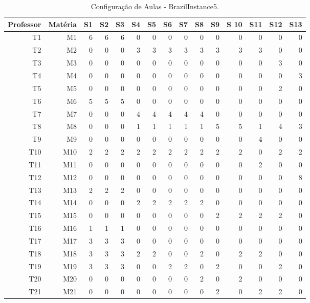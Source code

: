 \begin{table}[h]
	\centering
	\caption[Configuração de Aulas - BrazilInstance5]{Configuração de Aulas - BrazilInstance5.
		\label{tab:config_aulas_br5}}
	\begin{tabular}{rrrrrrrrrrrrrrr}
		\toprule
		Professor & Matéria & S1 & S2 & S3 & S4 & S5 & S6 & S7 & S8 & S9 & S 10 & S11 & S12 & S13 \\
		\midrule
		T1 & M1 & 6 & 6 & 6 & 0 & 0 & 0 & 0 & 0 & 0 & 0 & 0 & 0 & 0 \\
		T2 & M2 & 0 & 0 & 0 & 3 & 3 & 3 & 3 & 3 & 3 & 3 & 3 & 0 & 0 \\
		T3 & M3 & 0 & 0 & 0 & 0 & 0 & 0 & 0 & 0 & 0 & 0 & 0 & 3 & 0 \\
		T4 & M4 & 0 & 0 & 0 & 0 & 0 & 0 & 0 & 0 & 0 & 0 & 0 & 0 & 3 \\
		T5 & M5 & 0 & 0 & 0 & 0 & 0 & 0 & 0 & 0 & 0 & 0 & 0 & 2 & 0 \\
		T6 & M6 & 5 & 5 & 5 & 0 & 0 & 0 & 0 & 0 & 0 & 0 & 0 & 0 & 0 \\
		T7 & M7 & 0 & 0 & 0 & 4 & 4 & 4 & 4 & 4 & 0 & 0 & 0 & 0 & 0 \\
		T8 & M8 & 0 & 0 & 0 & 1 & 1 & 1 & 1 & 1 & 5 & 5 & 1 & 4 & 3 \\
		T9 & M9 & 0 & 0 & 0 & 0 & 0 & 0 & 0 & 0 & 0 & 0 & 4 & 0 & 0 \\
		T10 & M10 & 2 & 2 & 2 & 2 & 2 & 2 & 2 & 2 & 2 & 2 & 0 & 2 & 2 \\
		T11 & M11 & 0 & 0 & 0 & 0 & 0 & 0 & 0 & 0 & 0 & 0 & 2 & 0 & 0 \\
		T12 & M12 & 0 & 0 & 0 & 0 & 0 & 0 & 0 & 0 & 0 & 0 & 0 & 0 & 8 \\
		T13 & M13 & 2 & 2 & 2 & 0 & 0 & 0 & 0 & 0 & 0 & 0 & 0 & 0 & 0 \\
		T14 & M14 & 0 & 0 & 0 & 2 & 2 & 2 & 2 & 2 & 0 & 0 & 0 & 0 & 0 \\
		T15 & M15 & 0 & 0 & 0 & 0 & 0 & 0 & 0 & 0 & 2 & 2 & 2 & 2 & 0 \\
		T16 & M16 & 1 & 1 & 1 & 0 & 0 & 0 & 0 & 0 & 0 & 0 & 0 & 0 & 0 \\
		T17 & M17 & 3 & 3 & 3 & 0 & 0 & 0 & 0 & 0 & 0 & 0 & 0 & 0 & 0 \\
		T18 & M18 & 3 & 3 & 3 & 2 & 2 & 0 & 0 & 2 & 0 & 2 & 2 & 0 & 0 \\
		T19 & M19 & 3 & 3 & 3 & 0 & 0 & 2 & 2 & 0 & 2 & 0 & 0 & 2 & 0 \\
		T20 & M20 & 0 & 0 & 0 & 0 & 0 & 0 & 0 & 2 & 0 & 2 & 0 & 0 & 0 \\
		T21 & M21 & 0 & 0 & 0 & 0 & 0 & 0 & 0 & 0 & 2 & 0 & 2 & 2 & 0 \\

\end{tabular}
\end{table}
